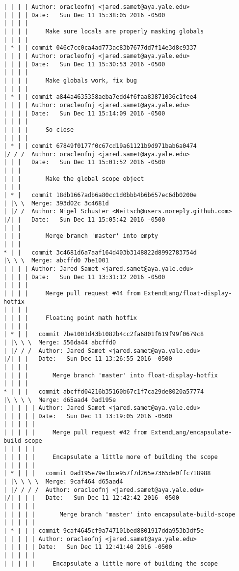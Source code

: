 \begin{lstlisting}
| | | | Author: oracleofnj <jared.samet@aya.yale.edu>
| | | | Date:   Sun Dec 11 15:38:05 2016 -0500
| | | | 
| | | |     Make sure locals are properly masking globals
| | | |     
| * | | commit 046c7cc0ca4ad773ac83b7677dd7f14e3d8c9337
| | | | Author: oracleofnj <jared.samet@aya.yale.edu>
| | | | Date:   Sun Dec 11 15:30:53 2016 -0500
| | | | 
| | | |     Make globals work, fix bug
| | | |     
| * | | commit a844a4635358aeba7edd4f6faa83871036c1fee4
| | | | Author: oracleofnj <jared.samet@aya.yale.edu>
| | | | Date:   Sun Dec 11 15:14:09 2016 -0500
| | | | 
| | | |     So close
| | | |     
| * | | commit 67849f0177f0c67cd19a61121b9d971bab6a0474
|/ / /  Author: oracleofnj <jared.samet@aya.yale.edu>
| | |   Date:   Sun Dec 11 15:01:52 2016 -0500
| | |   
| | |       Make the global scope object
| | |      
| * |   commit 18db1667adb6a80cc1d0bbb4b6b657ec6db0200e
| |\ \  Merge: 393d02c 3c4681d
| |/ /  Author: Nigel Schuster <Neitsch@users.noreply.github.com>
|/| |   Date:   Sun Dec 11 15:05:42 2016 -0500
| | |   
| | |       Merge branch 'master' into empty
| | |      
* | |   commit 3c4681d6a7aaf164d403b3148822d8992783754d
|\ \ \  Merge: abcffd0 7be1001
| | | | Author: Jared Samet <jared.samet@aya.yale.edu>
| | | | Date:   Sun Dec 11 13:31:12 2016 -0500
| | | | 
| | | |     Merge pull request #44 from ExtendLang/float-display-hotfix
| | | |     
| | | |     Floating point math hotfix
| | | |       
| * | |   commit 7be1001d43b1082b4cc2fa6801f619f99f0679c8
| |\ \ \  Merge: 556da44 abcffd0
| |/ / /  Author: Jared Samet <jared.samet@aya.yale.edu>
|/| | |   Date:   Sun Dec 11 13:26:55 2016 -0500
| | | |   
| | | |       Merge branch 'master' into float-display-hotfix
| | | |       
* | | |   commit abcffd04216b35160b67c1f7ca29de8020a57774
|\ \ \ \  Merge: d65aad4 0ad195e
| | | | | Author: Jared Samet <jared.samet@aya.yale.edu>
| | | | | Date:   Sun Dec 11 13:19:05 2016 -0500
| | | | | 
| | | | |     Merge pull request #42 from ExtendLang/encapsulate-build-scope
| | | | |     
| | | | |     Encapsulate a little more of building the scope
| | | | |        
| * | | |   commit 0ad195e79e1bce957f7d265e7365de0ffc718988
| |\ \ \ \  Merge: 9caf464 d65aad4
| |/ / / /  Author: oracleofnj <jared.samet@aya.yale.edu>
|/| | | |   Date:   Sun Dec 11 12:42:42 2016 -0500
| | | | |   
| | | | |       Merge branch 'master' into encapsulate-build-scope
| | | | |      
| * | | | commit 9caf4645cf9a747101bed8801917dda953b3df5e
| | | | | Author: oracleofnj <jared.samet@aya.yale.edu>
| | | | | Date:   Sun Dec 11 12:41:40 2016 -0500
| | | | | 
| | | | |     Encapsulate a little more of building the scope

\end{lstlisting}
